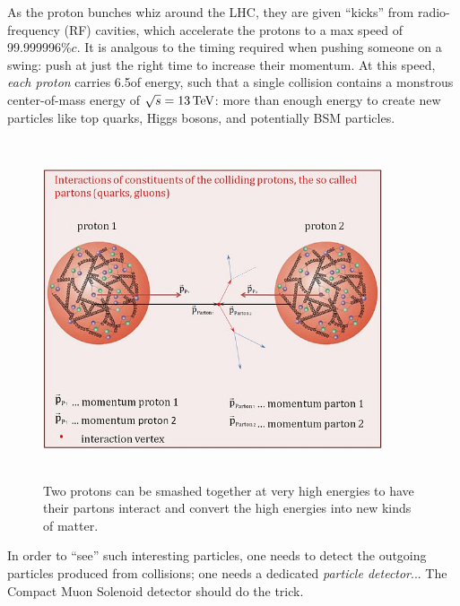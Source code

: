 As the proton bunches whiz around the LHC, they are given ``kicks'' from radio-frequency (RF) cavities, which accelerate the protons to a max speed of 99.999996\%$c$.
It is analgous to the timing required when pushing someone on a swing: push at just the right time to increase their momentum.
At this speed, \emph{each proton} carries 6.5\TeV of energy, such that a single \pp collision contains a monstrous center-of-mass energy of $\sqrt{s} = 13\,\text{Te\hspace{-.08em}V}$:
more than enough energy to create new particles like top quarks, Higgs bosons, and potentially BSM particles.
\begin{figure}[pbth]
    \centering
    \includegraphics[width=10cm,height=10cm,keepaspectratio]{figures/lhc/proton_proton_quarksandgluons.jpg}
        \caption{
        Two protons can be smashed together at very high energies to have their partons interact and convert the high energies into new kinds of matter.} 
        \label{fig:pp_collision}
    \end{figure}
In order to ``see'' such interesting particles, one needs to detect the outgoing particles produced from \pp collisions;
one needs a dedicated \emph{particle detector}...
The Compact Muon Solenoid detector should do the trick.


